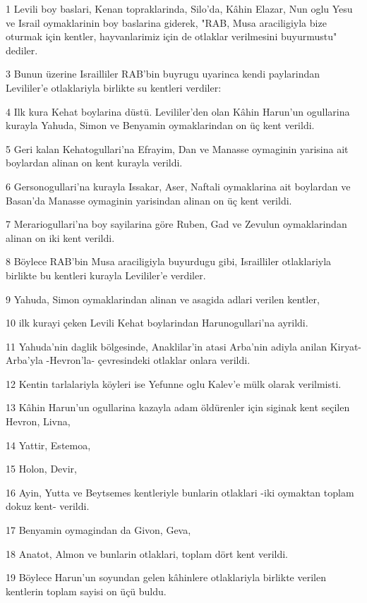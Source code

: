 \par 1 Levili boy baslari, Kenan topraklarinda, Silo'da, Kâhin Elazar, Nun oglu Yesu ve Israil oymaklarinin boy baslarina giderek, "RAB, Musa araciligiyla bize oturmak için kentler, hayvanlarimiz için de otlaklar verilmesini buyurmustu" dediler.
\par 3 Bunun üzerine Israilliler RAB'bin buyrugu uyarinca kendi paylarindan Levililer'e otlaklariyla birlikte su kentleri verdiler:
\par 4 Ilk kura Kehat boylarina düstü. Levililer'den olan Kâhin Harun'un ogullarina kurayla Yahuda, Simon ve Benyamin oymaklarindan on üç kent verildi.
\par 5 Geri kalan Kehatogullari'na Efrayim, Dan ve Manasse oymaginin yarisina ait boylardan alinan on kent kurayla verildi.
\par 6 Gersonogullari'na kurayla Issakar, Aser, Naftali oymaklarina ait boylardan ve Basan'da Manasse oymaginin yarisindan alinan on üç kent verildi.
\par 7 Merariogullari'na boy sayilarina göre Ruben, Gad ve Zevulun oymaklarindan alinan on iki kent verildi.
\par 8 Böylece RAB'bin Musa araciligiyla buyurdugu gibi, Israilliler otlaklariyla birlikte bu kentleri kurayla Levililer'e verdiler.
\par 9 Yahuda, Simon oymaklarindan alinan ve asagida adlari verilen kentler,
\par 10 ilk kurayi çeken Levili Kehat boylarindan Harunogullari'na ayrildi.
\par 11 Yahuda'nin daglik bölgesinde, Anaklilar'in atasi Arba'nin adiyla anilan Kiryat-Arba'yla -Hevron'la- çevresindeki otlaklar onlara verildi.
\par 12 Kentin tarlalariyla köyleri ise Yefunne oglu Kalev'e mülk olarak verilmisti.
\par 13 Kâhin Harun'un ogullarina kazayla adam öldürenler için siginak kent seçilen Hevron, Livna,
\par 14 Yattir, Estemoa,
\par 15 Holon, Devir,
\par 16 Ayin, Yutta ve Beytsemes kentleriyle bunlarin otlaklari -iki oymaktan toplam dokuz kent- verildi.
\par 17 Benyamin oymagindan da Givon, Geva,
\par 18 Anatot, Almon ve bunlarin otlaklari, toplam dört kent verildi.
\par 19 Böylece Harun'un soyundan gelen kâhinlere otlaklariyla birlikte verilen kentlerin toplam sayisi on üçü buldu.

